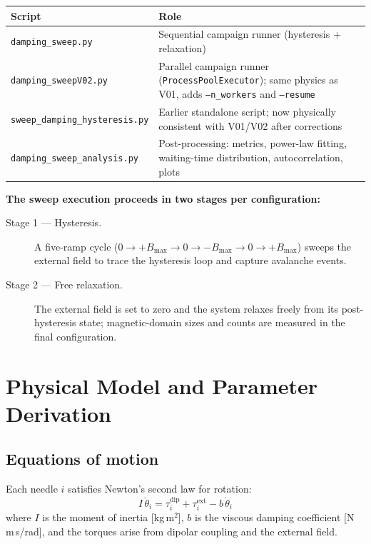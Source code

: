 \documentclass[11pt,a4paper]{article}
\newcommand{\file}[1]{\texttt{#1}}
\newcommand{\param}[1]{\texttt{--#1}}
\begin{document}
\begin{center}
\begin{tabular}{lp{10cm}}
\toprule
Script & Role \\
\midrule
\file{damping\_sweep.py} & Sequential campaign runner (hysteresis + relaxation) \\
\file{damping\_sweepV02.py} & Parallel campaign runner (\texttt{ProcessPoolExecutor});
  same physics as V01, adds \param{n\_workers} and \param{resume} \\
\file{sweep\_damping\_hysteresis.py} & Earlier standalone script; now physically
  consistent with V01/V02 after corrections \\
\file{damping\_sweep\_analysis.py} & Post-processing: metrics, power-law fitting,
  waiting-time distribution, autocorrelation, plots \\
\bottomrule
\end{tabular}
\end{center}

\medskip
\textbf{The sweep execution proceeds in two stages per configuration:}
\begin{description}
\item[Stage 1 --- Hysteresis.] A five-ramp cycle
  ($0 \to +B_{\max} \to 0 \to -B_{\max} \to 0 \to +B_{\max}$)
  sweeps the external field to trace the hysteresis loop and capture
  avalanche events.
\item[Stage 2 --- Free relaxation.] The external field is set to zero and the
  system relaxes freely from its post-hysteresis state; magnetic-domain sizes
  and counts are measured in the final configuration.
\end{description}

\section{Physical Model and Parameter Derivation}
\label{sec:physics}

\subsection{Equations of motion}

Each needle $i$ satisfies Newton's second law for rotation:
\begin{equation}
  I\,\ddot{\theta}_i = \tau_i^{\mathrm{dip}} + \tau_i^{\mathrm{ext}} - b\,\dot{\theta}_i
\end{equation}
where $I$ is the moment of inertia [kg\,m$^2$], $b$ is the viscous damping
coefficient [N\,m\,s/rad], and the torques arise from dipolar coupling and
the external field.
\end{document}
